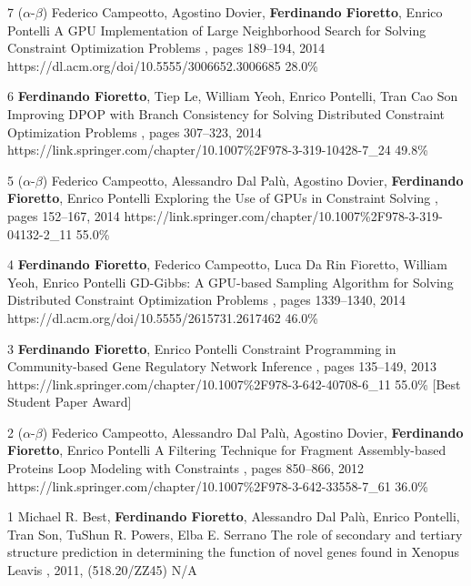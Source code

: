 \begin{pubs}
	\confentry 
		{7} %
		{($\alpha$-$\beta$) 
		Federico Campeotto, Agostino Dovier, {\bf Ferdinando Fioretto}, Enrico Pontelli}
		{A GPU Implementation of Large Neighborhood Search for Solving Constraint Optimization Problems} 
		{\procECAI, pages 189--194, 2014}
		{https://dl.acm.org/doi/10.5555/3006652.3006685}
		{28.0\%}

	\confentry
		{6} %
		{{\bf Ferdinando Fioretto}, Tiep Le, William Yeoh, Enrico Pontelli, Tran Cao Son}
		{Improving DPOP with Branch Consistency for Solving Distributed Constraint Optimization Problems}
		{\procCP, pages 307--323, 2014}
		{https://link.springer.com/chapter/10.1007\%2F978-3-319-10428-7\_24}
		{49.8\%}
		
	\confentry
		{5} %
		{($\alpha$-$\beta$) 
		Federico Campeotto, Alessandro Dal Pal\`{u}, Agostino Dovier, {\bf Ferdinando Fioretto}, Enrico Pontelli}
		{Exploring the Use of GPUs in Constraint Solving}
		{\procPADL, pages 152--167, 2014}
		{https://link.springer.com/chapter/10.1007\%2F978-3-319-04132-2\_11}
		{55.0\%}

	\confentry 
		{4} %
		{{\bf Ferdinando Fioretto}, Federico Campeotto, Luca Da Rin Fioretto, William Yeoh, Enrico Pontelli} 
		{GD-Gibbs: A GPU-based Sampling Algorithm for Solving Distributed Constraint Optimization Problems} %
		{\procAAMAS, pages 1339--1340, 2014}
		{https://dl.acm.org/doi/10.5555/2615731.2617462}
		{46.0\%}
	
	\confentryAwd
		{3} %
		{{\bf Ferdinando Fioretto}, Enrico Pontelli} 
		{Constraint Programming in Community-based Gene Regulatory Network Inference} 
		{\procCMSB, pages 135--149, 2013}
		{https://link.springer.com/chapter/10.1007\%2F978-3-642-40708-6\_11}
		{55.0\%}
		{[Best Student Paper Award]}{}

	\confentry 
		{2} %
		{($\alpha$-$\beta$) 
		Federico Campeotto, Alessandro Dal Pal\`{u}, Agostino Dovier, {\bf Ferdinando Fioretto}, Enrico Pontelli}
		{A Filtering Technique for Fragment Assembly-based Proteins Loop Modeling with Constraints} 
		{\procCP, pages 850--866, 2012}
		{https://link.springer.com/chapter/10.1007\%2F978-3-642-33558-7\_61}
		{36.0\%}

	\confentry
		{1} %
		{Michael R. Best, {\bf Ferdinando Fioretto}, Alessandro Dal Pal\`{u}, Enrico Pontelli, Tran Son, TuShun R. Powers, Elba E. Serrano}
		{The role of secondary and tertiary structure prediction in determining the function of novel genes found in Xenopus Leavis}
		{, 2011, (518.20/ZZ45)}{}
		{N/A}
\end{pubs}


